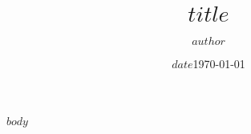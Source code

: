 \documentclass{article}
\author{$author$}
\author{}
\title{$title$}
\title{}
\date{$date$}
\date{\today}
\begin{document}
\maketitle

$body$

\newpage

\printbibliography
\end{document}
